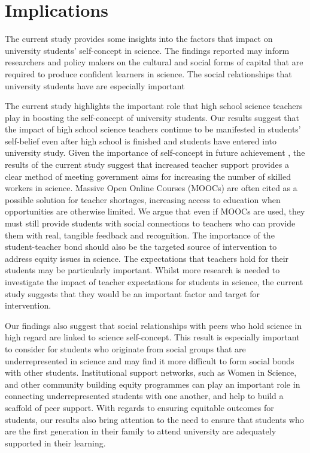 \section*{Implications}
The current study provides some insights into the factors that impact on university students' self-concept in science. The findings reported may inform researchers and policy makers on the cultural and social forms of capital that are required to produce confident learners in science. The social relationships that university students have are especially important

The current study highlights the important role that high school science teachers play in boosting the self-concept of university students. Our results suggest that the impact of high school science teachers continue to be manifested in students' self-belief even after high school is finished and students have entered into university study. Given the importance of self-concept in future achievement \cite{uccar2017role,chang2008science}, the results of the current study suggest that increased teacher support provides a clear method of meeting government aims for increasing the number of skilled workers in science. Massive Open Online Courses (MOOCs) are often cited as a possible solution for teacher shortages, increasing access to education when opportunities are otherwise limited. We argue that even if MOOCs are used, they must still provide students with social connections to teachers who can provide them with real, tangible feedback and recognition. The importance of the student-teacher bond should also be the targeted source of intervention to address equity issues in science. The expectations that teachers hold for their students may be particularly important.\cite{rubie2006teacher} Whilst more research is needed to investigate the impact of teacher expectations for students in science, the current study suggests that they would be an important factor and target for intervention.

Our findings also suggest that social relationships with peers who hold science in high regard are linked to science self-concept. This result is especially important to consider for students who originate from social groups that are underrepresented in science and may find it more difficult to form social bonds with other students. Institutional support networks, such as Women in Science, and other community building equity programmes can play an important role in connecting underrepresented students with one another, and help to build a scaffold of peer support.  With regards to ensuring equitable outcomes for students, our results also bring attention to the need to ensure that students who are the first generation in their family to attend university are adequately supported in their learning.  

